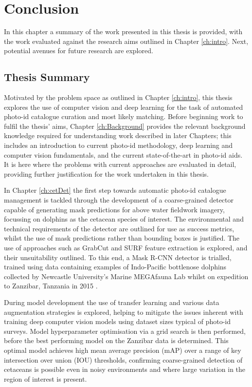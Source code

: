 \chapter{Conclusion}\label{ch:Conclusion}

In this chapter a summary of the work presented in this thesis is provided, with the work evaluated against the research aims outlined in Chapter \ref{ch:intro}. Next, potential avenues for future research are explored. 

\section{Thesis Summary}\label{ch:Conclusion,sec:Summary}

Motivated by the problem space as outlined in Chapter \ref{ch:intro}, this thesis explores the use of computer vision and deep learning for the task of automated photo-id catalogue curation and most likely matching. Before beginning work to fulfil the thesis' aims, Chapter \ref{ch:Background} provides the relevant background knowledge required for understanding work described in later Chapters; this includes an introduction to current photo-id methodology, deep learning and computer vision fundamentals, and the current state-of-the-art in photo-id aids. It is here where the problems with current approaches are evaluated in detail, providing further justification for the work undertaken in this thesis. 

In Chapter \ref{ch:cetDet} the first step towards automatic photo-id catalogue management is tackled through the development of a coarse-grained detector capable of generating mask predictions for above water fieldwork imagery, focussing on dolphins as the cetacean species of interest. The environmental and technical requirements of the detector are outlined for use as success metrics, whilst the use of mask predictions rather than bounding boxes is justified. The use of approaches such as GrabCut \cite{rother_grabcut_2004} and SURF feature extraction \cite{bay_speeded-up_2008} is explored, and their unsuitability outlined. To this end, a Mask R-CNN \cite{he_mask_2017} detector is trialled, trained using data  containing examples of Indo-Pacific bottlenose dolphins collected by Newcastle University's Marine MEGAfauna Lab whilst on expedition to Zanzibar, Tanzania in 2015 \cite{sharpe_indian_2019}. 

During model development the use of transfer learning and various data augmentation strategies is explored, helping to mitigate the issues inherent with training deep computer vision models using dataset sizes typical of photo-id surveys. Model hyperparameter optimisation via a grid search is then performed, before the best performing model on the Zanzibar data is determined. This optimal model achieves high mean average precision (mAP) over a range of key intersection over union (IOU) thresholds, confirming coarse-grained detection of cetaceans is possible even in noisy environments and where large variation in the region of interest is present. 

